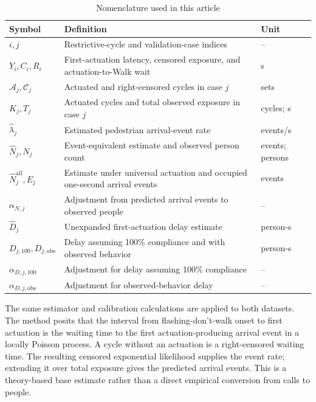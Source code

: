 \documentclass[11pt]{article}
\begin{document}
\begin{table}[htbp]
\centering
\caption{Nomenclature used in this article}
\label{tab:nomenclature}
\footnotesize
\begin{tabular}{@{}p{}p{}p{}@{}}
\toprule
Symbol & Definition & Unit \\
\midrule
\(i,j\) & Restrictive-cycle and validation-case indices & -- \\
\(Y_i,C_i,R_i\) & First-actuation latency, censored exposure, and actuation-to-Walk wait & s \\
\(\mathcal A_j,\mathcal C_j\) & Actuated and right-censored cycles in case \(j\) & sets \\
\(K_j,T_j\) & Actuated cycles and total observed exposure in case \(j\) & cycles; s \\
\(\widehat\lambda_j\) & Estimated pedestrian arrival-event rate & events/s \\
\(\widehat N_j,N_j\) & Event-equivalent estimate and observed person count & events; persons \\
\(\widehat N^{\mathrm{all}}_j,E_j\) & Estimate under universal actuation and occupied one-second arrival events & events \\
\(\alpha_{N,j}\) & Adjustment from predicted arrival events to observed people & -- \\
\(\widehat D_j\) & Unexpanded first-actuation delay estimate & person-s \\
\(D_{j,100},D_{j,\mathrm{obs}}\) & Delay assuming 100\% compliance and with observed behavior & person-s \\
\(\alpha_{D,j,100}\) & Adjustment for delay assuming 100\% compliance & -- \\
\(\alpha_{D,j,\mathrm{obs}}\) & Adjustment for observed-behavior delay & -- \\
\bottomrule
\end{tabular}
\end{table}

The same estimator and calibration calculations are applied to both datasets. The method posits that the interval from flashing-don't-walk onset to first actuation is the waiting time to the first actuation-producing arrival event in a locally Poisson process. A cycle without an actuation is a right-censored waiting time. The resulting censored exponential likelihood supplies the event rate; extending it over total exposure gives the predicted arrival events. This is a theory-based base estimate rather than a direct empirical conversion from calls to people.
\end{document}
